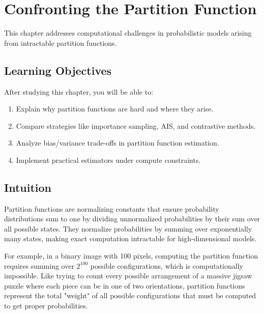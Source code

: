 
\chapter{Confronting the Partition Function}
\label{chap:partition-function}

This chapter addresses computational challenges in probabilistic models arising from intractable partition functions.


\section*{Learning Objectives}

After studying this chapter, you will be able to:

\begin{enumerate}
    \item Explain why partition functions are hard and where they arise.
    \item Compare strategies like importance sampling, AIS, and contrastive methods.
    \item Analyze bias/variance trade-offs in partition function estimation.
    \item Implement practical estimators under compute constraints.
\end{enumerate}



\section*{Intuition}

Partition functions are normalizing constants that ensure probability distributions sum to one by dividing unnormalized probabilities by their sum over all possible states. They normalize probabilities by summing over exponentially many states, making exact computation intractable for high-dimensional models.

For example, in a binary image with 100 pixels, computing the partition function requires summing over $2^{100}$ possible configurations, which is computationally impossible. Like trying to count every possible arrangement of a massive jigsaw puzzle where each piece can be in one of two orientations, partition functions represent the total "weight" of all possible configurations that must be computed to get proper probabilities.

